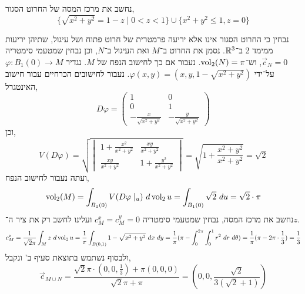 \subquestion{}
נחשב את מרכז המסה של החרוט הסגור,
\[
	\{ \sqrt{x^2 + y^2} = 1 - z \mid 0 < z < 1 \} \cup \{ x^2 + y^2 \le 1, z = 0 \}
\]
\begin{solution}
	נבחין כי החרוט הסגור אינו אלא יריעה פרמטרית של חרוט פתוח ושל עיגול, שתיהן יריעות ממימד 2 ב־$\mathbb{R}^3$.
	נסמן את החרוט ב־$M$ ואת העיגול ב־$N$, וכן נבחין שמטעמי סימטריה $\vec{c}_N = 0$, וש־$\operatorname{vol}_2(N) = \pi$.
	נעבור אם כך לחישוב הנפח של $M$.
	נגדיר $\varphi : B_1(0) \to M$ על־ידי $\varphi(x, y) = (x, y, 1 - \sqrt{x^2 + y^2})$.
	נעבור לחישובים הכרחיים עבור חישוב האינטגרל,
	\[
		D\varphi
		= \begin{pmatrix}
			1 & 0 \\
			0 & 1 \\
			-\frac{x}{\sqrt{x^2 + y^2}} & -\frac{y}{\sqrt{x^2 + y^2}}
		\end{pmatrix}
	\]
	וכן,
	\[
		V(D\varphi)
		= \sqrt{\begin{vmatrix}
				1 + \frac{x^2}{x^2 + y^2} & \frac{xy}{x^2 + y^2} \\
				\frac{xy}{x^2 + y^2} & 1 + \frac{y^2}{x^2 + y^2}
		\end{vmatrix}}
		= \sqrt{1 + \frac{x^2 + y^2}{x^2 + y^2}}
		= \sqrt{2}
	\]
	ועתה נעבור לחישוב הנפח,
	\[
		\operatorname{vol}_2(M)
		= \int_{B_1(0)} V(D\varphi \mid_u)\ d\operatorname{vol}_2 u
		= \int_{B_1(0)} \sqrt{2}\ du
		= \sqrt{2} \cdot \pi
	\]
	נחשב את מרכז המסה, נבחין שמטעמי סימטריה $c_M^x = c_M^y = 0$ ועלינו לחשב רק את ציר ה־$z$.
	\[
		c_M^z
		= \frac{1}{\sqrt{2} \pi} \int_M z\ d\operatorname{vol}_2 u
		= \frac{1}{\pi} \int_{B(0, 1)} 1 - \sqrt{x^2 + y^2}\ dx\ dy
		= \frac{1}{\pi} (\pi - \int_{0}^{2 \pi} \int_{0}^{1} r^2\ dr\ d \theta)
		= \frac{1}{\pi} (\pi - 2 \pi \cdot \frac{1}{3})
		= \frac{1}{3}
	\]
	ולבסוף נשתמש בתוצאת סעיף ב' ונקבל,
	\[
		\vec{c}_{M \cup N}
		= \frac{\sqrt{2}\pi \cdot (0, 0, \frac{1}{3}) + \pi (0, 0, 0)}{\sqrt{2}\pi + \pi}
		= \left(0, 0, \frac{\sqrt{2}}{3(\sqrt{2} + 1)}\right)
	\]
\end{solution}

